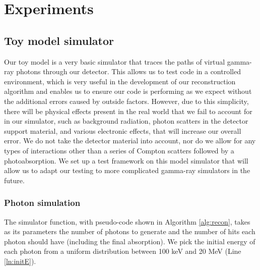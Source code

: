 \chapter{Experiments}

\section{Toy model simulator}
Our toy model is a very basic simulator that traces the paths of virtual gamma-ray photons through our detector. This allows us to test code in a controlled environment, which is very useful in the development of our reconstruction algorithm and enables us to ensure our code is performing as we expect without the additional errors caused by outside factors. However, due to this simplicity, there will be physical effects present in the real world that we fail to account for in our simulator, such as background radiation, photon scatters in the detector support material, and various electronic effects, that will increase our overall error. We do not take the detector material into account, nor do we allow for any types of interactions other than a series of Compton scatters followed by a photoabsorption. We set up a test framework on this model simulator that will allow us to adapt our testing to more complicated gamma-ray simulators in the future.

\subsection{Photon simulation} \label{toy_model}
The simulator function, with pseudo-code shown in Algorithm \ref{alg:recon}, takes as its parameters the number of photons to generate and the number of hits each photon should have (including the final absorption). We pick the initial energy of each photon from a uniform distribution between 100 keV and 20 MeV (Line \ref{ln:initE}).

